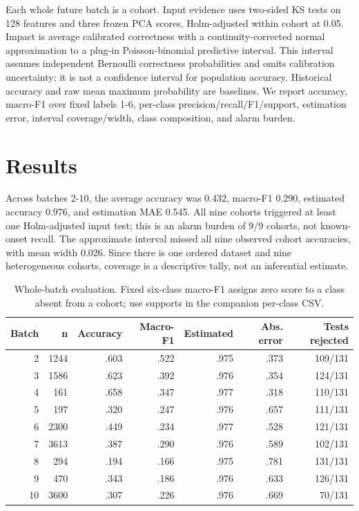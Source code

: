 \documentclass[10pt]{article}
\begin{document}
Each whole future batch is a cohort. Input evidence uses two-sided KS tests on 128 features and three frozen PCA scores, Holm-adjusted within cohort at 0.05. Impact is average calibrated correctness with a continuity-corrected normal approximation to a plug-in Poisson-binomial predictive interval. This interval assumes independent Bernoulli correctness probabilities and omits calibration uncertainty; it is not a confidence interval for population accuracy. Historical accuracy and raw mean maximum probability are baselines. We report accuracy, macro-F1 over fixed labels 1-6, per-class precision/recall/F1/support, estimation error, interval coverage/width, class composition, and alarm burden.

\section{Results}
Across batches 2-10, the average accuracy was 0.432, macro-F1 0.290, estimated accuracy 0.976, and estimation MAE 0.545. All nine cohorts triggered at least one Holm-adjusted input test; this is an alarm burden of 9/9 cohorts, not known-onset recall. The approximate interval missed all nine observed cohort accuracies, with mean width 0.026. Since there is one ordered dataset and nine heterogeneous cohorts, coverage is a descriptive tally, not an inferential estimate.

\begin{table}[h]
\centering\small
\begin{tabular}{rrrrrrr}
\toprule Batch & n & Accuracy & Macro-F1 & Estimated & Abs. error & Tests rejected\\
\midrule
2 & 1244 & .603 & .522 & .975 & .373 & 109/131\\
3 & 1586 & .623 & .392 & .976 & .354 & 124/131\\
4 & 161 & .658 & .347 & .977 & .318 & 110/131\\
5 & 197 & .320 & .247 & .976 & .657 & 111/131\\
6 & 2300 & .449 & .234 & .977 & .528 & 121/131\\
7 & 3613 & .387 & .290 & .976 & .589 & 102/131\\
8 & 294 & .194 & .166 & .975 & .781 & 131/131\\
9 & 470 & .343 & .186 & .976 & .633 & 126/131\\
10 & 3600 & .307 & .226 & .976 & .669 & 70/131\\
\bottomrule
\end{tabular}
\caption{Whole-batch evaluation. Fixed six-class macro-F1 assigns zero score to a class absent from a cohort; use supports in the companion per-class CSV.}
\end{table}
\end{document}
